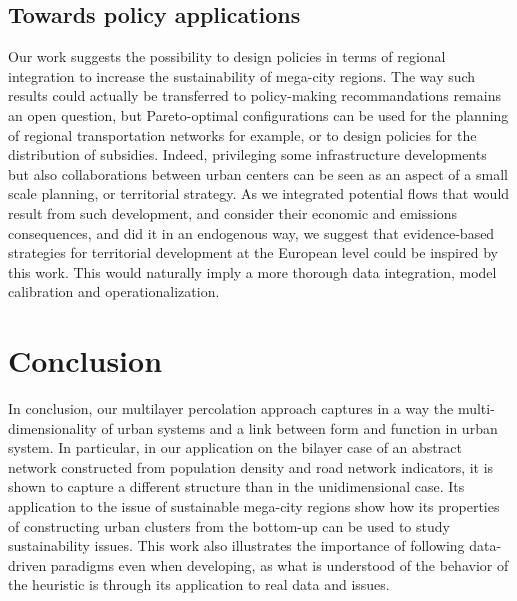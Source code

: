 \documentclass{jimis-en}
\begin{document}
\subsection{Towards policy applications}


Our work suggests the possibility to design policies in terms of regional integration to increase the sustainability of mega-city regions. The way such results could actually be transferred to policy-making recommandations remains an open question, but Pareto-optimal configurations can be used for the planning of regional transportation networks for example, or to design policies for the distribution of subsidies. Indeed, privileging some infrastructure developments but also collaborations between urban centers can be seen as an aspect of a small scale planning, or territorial strategy. As we integrated potential flows that would result from such development, and consider their economic and emissions consequences, and did it in an endogenous way, we suggest that evidence-based strategies for territorial development at the European level could be inspired by this work. This would naturally imply a more thorough data integration, model calibration and operationalization.

  

\section{Conclusion}


In conclusion, our multilayer percolation approach captures in a way the multi-dimensionality of urban systems and a link between form and function in urban system. In particular, in our application on the bilayer case of an abstract network constructed from population density and road network indicators, it is shown to capture a different structure than in the unidimensional case. Its application to the issue of sustainable mega-city regions show how its properties of constructing urban clusters from the bottom-up can be used to study sustainability issues. This work also illustrates the importance of following data-driven paradigms even when developing, as what is understood of the behavior of the heuristic is through its application to real data and issues.









\end{document}
